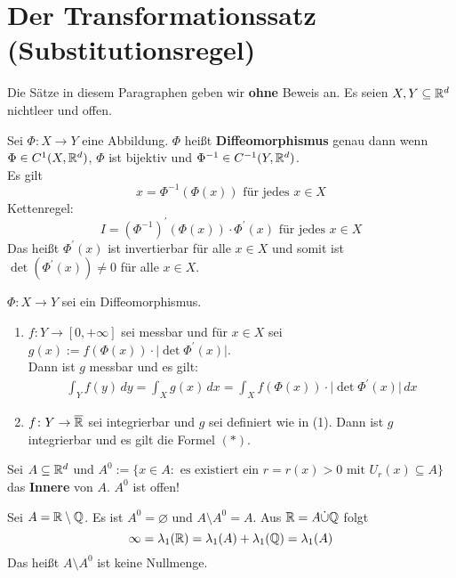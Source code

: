 \documentclass[a4paper,twoside,DIV15,BCOR12mm,chapterprefix=true,headings=onelinechapter]{scrbook}
\begin{document}
\chapter{Der Transformationssatz (Substitutionsregel)}

Die Sätze in diesem Paragraphen geben wir \textbf{ohne} Beweis an. Es seien
\(X,Y\subseteq\mathbb{R}^d\) nichtleer und offen. 

\begin{definition}
Sei \(\Phi\colon X\to Y\) eine Abbildung. \(\Phi\) heißt 
\textbf{Diffeomorphismus} genau dann wenn \(\Phi\in C^1(X,\mathbb{R}^d)\), \(\Phi\)
ist bijektiv und \(\Phi^{-1}\in C^{-1}(Y,\mathbb{R}^d)\).\\
Es gilt \[x=\Phi^{-1}(\Phi(x))\text{ für jedes } x\in X\]
Kettenregel: \[I=\left(\Phi^{-1}\right)^\prime(\Phi(x))\cdot\Phi^\prime(x)
\text{ für jedes } x\in X\] Das heißt \(\Phi^\prime(x)\) ist invertierbar für
alle \(x\in X\) und somit ist \(\det\left(\Phi^\prime(x)\right)\neq 0\)
für alle \(x\in X\).
\end{definition}

\begin{satz}
\label{Satz 11.1}
\(\Phi\colon X\to Y\) sei ein Diffeomorphismus.
\begin{enumerate}
\item	\(f\colon Y\to[0,+\infty]\) sei messbar und für \(x\in X\) sei
	\(g(x):=f\left(\Phi(x)\right)\cdot\lvert\det\Phi^\prime(x)\rvert\).\\
	Dann ist \(g\) messbar und es gilt:
	\begin{align*}\tag{$*$} \int_Yf(y)\,dy=\int_Xg(x)\,dx=\int_Xf\left(\Phi(x)\right)
	\cdot\lvert\det\Phi^\prime(x)\rvert\,dx\end{align*}
\item	\(f\colon Y\to\overline{\mathbb{R}}\) sei integrierbar und $g$ sei definiert wie in (1).
	Dann ist $g$ integrierbar und es gilt die Formel \((\ast)\).
\end{enumerate}
\end{satz}

\begin{erinnerung}
Sei \(A\subseteq\mathbb{R}^d\) und \(A^0:=\{x\in A :\text{ es existiert ein } r=r(x)>0
\text{ mit } U_r(x)\subseteq A\}\) das \textbf{Innere} von $A$. $A^0$ ist offen!
\end{erinnerung}

\begin{beispiel}
Sei \(A=\mathbb{R}\setminus\mathbb{Q}\). Es ist \(A^0=\varnothing\) und 
\(A\setminus A^0=A\). Aus \(\mathbb{R}=A\dot\cup\mathbb{Q}\) folgt
\[\infty=\lambda_1(\mathbb{R})=\lambda_1(A)+\lambda_1(\mathbb{Q})=\lambda_1(A)\]
Das heißt \(A\setminus A^0\) ist keine Nullmenge.
\end{beispiel}
\end{document}
